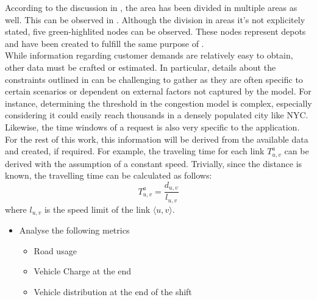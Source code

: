 According to the discussion in , the area has been divided in multiple areas as well. This can be observed in . Although the division in areas it's not explicitely stated, five green-highlited nodes can be observed. These nodes represent depots and have been created to fulfill the same purpose of . \\
While information regarding customer demands are relatively easy to obtain, other data must be crafted or estimated. In particular, details about the constraints outlined in  can be challenging to gather as they are often specific to certain scenarios or dependent on external factors not captured by the model. For instance, determining the threshold in the congestion model is complex, especially considering it could easily reach thousands in a densely populated city like NYC. Likewise, the time windows of a request is also very specific to the application. For the rest of this work, this information will be derived from the available data and created, if required. For example, the traveling time for each link $T^a_{u,v}$ can be derived with the assumption of a constant speed. Trivially, since the distance is known, the travelling time can be calculated as follows: \\
\begin{equation}
	T^a_{u,v} = \dfrac{d_{u,v} }{l_{u,v}}
\end{equation}
where $l_{u,v}$ is the speed limit of the link $\langle u,v\rangle$. 
\begin{itemize}
	\item Analyse the following metrics
	\begin{itemize}
		\item Road usage
		\item Vehicle Charge at the end
		\item Vehicle distribution at the end of the shift
	\end{itemize}
	
	
\end{itemize}


